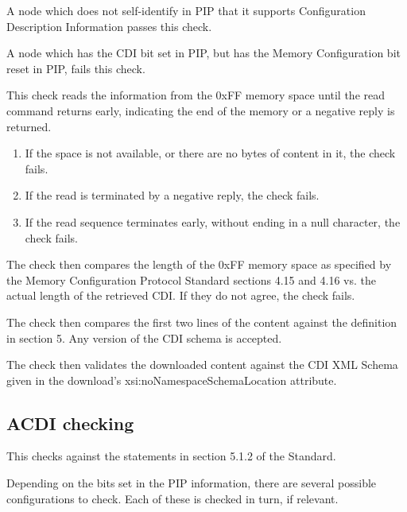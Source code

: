 A node which does not self-identify in PIP that it supports
Configuration Description Information passes this check.

A node which has the CDI bit set in PIP, but
has the Memory Configuration bit reset in PIP, fails this check.
\pipsetFootnote

This check reads the information from the 0xFF memory space
until the read command returns early, indicating the end of the memory
or a negative reply is returned.
\begin{enumerate}
\item If the space is not available, or there are no bytes of content in it, the check fails.
\item If the read is terminated by a negative reply, the check fails.
\item If the read sequence terminates early, without ending in a null character, the check fails.
\end{enumerate}
 
The check then compares the length of the 0xFF memory space 
as specified by the Memory Configuration Protocol Standard sections 4.15 and 4.16
vs. the actual length of the retrieved CDI.
If they do not agree, the check fails.

The check then compares the first two lines of the content against the 
definition in section 5. 
Any version of the CDI schema is accepted.

The check then validates the downloaded content against the CDI XML Schema
given in the download's xsi:noNamespaceSchemaLocation attribute.

\subsection{ACDI checking}

This checks against the statements in section 5.1.2 of the Standard.

Depending on the bits set in the PIP information, there are several 
possible configurations to check. Each of these is checked in turn, if relevant.

